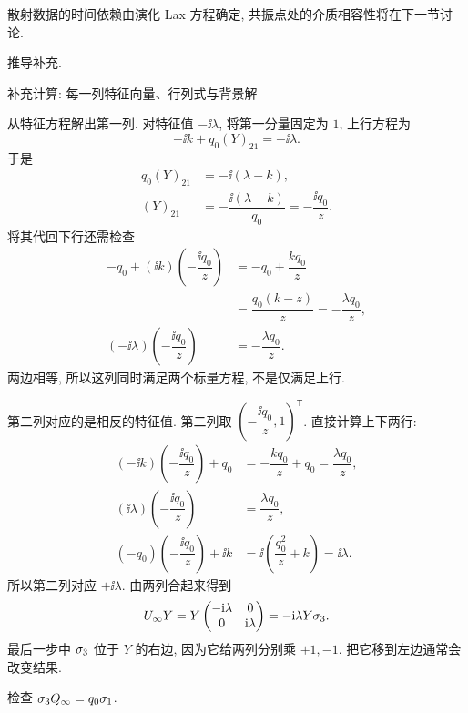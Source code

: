 散射数据的时间依赖由演化 Lax 方程确定, 共振点处的介质相容性将在下一节讨论.

\par\medskip\noindent 推导补充.\par

\par\medskip\noindent 补充计算: 每一列特征向量、行列式与背景解\par
\par\smallskip\noindent 从特征方程解出第一列.\quad
对特征值 $-\ii\lambda$, 将第一分量固定为 $1$, 上行方程为
\begin{equation*}
-\ii k+q_0(Y)_{21}=-\ii\lambda.
\end{equation*}
于是
\begin{align*}
q_0(Y)_{21}&=-\ii(\lambda-k),\\
(Y)_{21}&=-\dfrac{\ii(\lambda-k)}{q_0}
=-\dfrac{\ii q_0}{z}.
\end{align*}
将其代回下行还需检查
\begin{align*}
-q_0+(\ii k)\left(-\dfrac{\ii q_0}{z}\right)
&=-q_0+\dfrac{kq_0}{z}\\
&=\dfrac{q_0(k-z)}{z}
=-\dfrac{\lambda q_0}{z},\\
(-\ii\lambda)\left(-\dfrac{\ii q_0}{z}\right)
&=-\dfrac{\lambda q_0}{z}.
\end{align*}
两边相等, 所以这列同时满足两个标量方程, 不是仅满足上行.
\par\smallskip\noindent 第二列对应的是相反的特征值.\quad
第二列取 $\left(-\dfrac{\ii q_0}{z},1\right)^{\mathsf T}$. 直接计算上下两行:
\begin{align*}
(-\ii k)\left(-\dfrac{\ii q_0}{z}\right)+q_0
&=-\dfrac{kq_0}{z}+q_0
=\dfrac{\lambda q_0}{z},\\
(\ii\lambda)\left(-\dfrac{\ii q_0}{z}\right)
&=\dfrac{\lambda q_0}{z},\\
(-q_0)\left(-\dfrac{\ii q_0}{z}\right)+\ii k
&=\ii\left(\dfrac{q_0^2}{z}+k\right)
=\ii\lambda.
\end{align*}
所以第二列对应 $+\ii\lambda$. 由两列合起来得到
\begin{equation*}
U_\infty Y
=Y\begin{pmatrix}-\mathrm{i}\lambda&0\\0&\mathrm{i}\lambda\end{pmatrix}
=-\mathrm{i}\lambda Y\sigma_3.
\end{equation*}
最后一步中 $\sigma_3$ 位于 $Y$ 的右边, 因为它给两列分别乘 $+1,-1$. 把它移到左边通常会改变结果.
\par\smallskip\noindent 检查 $\sigma_3 Q_\infty=q_0\sigma_1$.\quad
